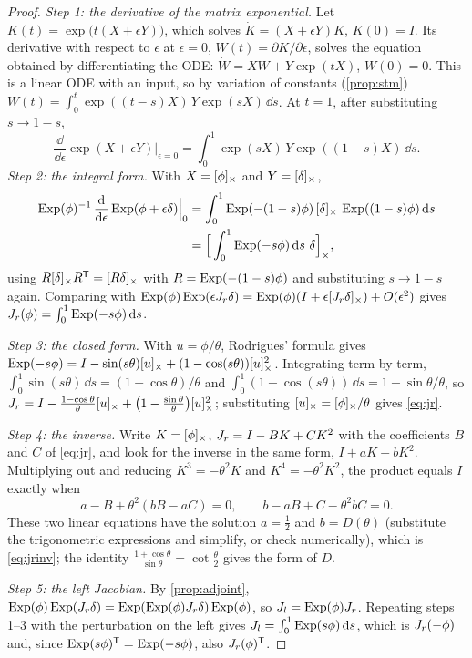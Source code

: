 \begin{proof}
\emph{Step 1: the derivative of the matrix exponential.} Let $K(t) = \exp\big(t(X + \epsilon Y)\big)$, which solves
$\dot K = (X + \epsilon Y)K$, $K(0) = I$. Its derivative with respect to $\epsilon$ at $\epsilon = 0$, $W(t) = \partial K/\partial\epsilon$, solves the equation obtained by
differentiating the ODE: $\dot W = XW + Y\exp(tX)$, $W(0) = 0$. This is a linear ODE with an input, so by variation of constants
(\cref{prop:stm}) $W(t) = \int_0^t\exp((t - s)X)\,Y\exp(sX)\,\dd s$. At $t = 1$, after substituting $s \to 1 - s$,
\begin{equation*}
  \frac{\dd}{\dd\epsilon}\exp(X + \epsilon Y)\Big|_{\epsilon=0} = \int_0^1 \exp(sX)\,Y\exp((1-s)X)\,\dd s .
\end{equation*}
\emph{Step 2: the integral form.} With $X = [\phi]_{\times}$ and $Y = [\delta]_{\times}$,
\begin{align*}
  \operatorname{Exp}(\phi)^{-1}\,\frac{\mathrm{d}}{\mathrm{d}\epsilon}\operatorname{Exp}(\phi + \epsilon\delta)\Big|_0
  &= \int_0^1 \operatorname{Exp}(-(1-s)\phi)\,[\delta]_{\times}\,\operatorname{Exp}((1-s)\phi)\,\mathrm{d} s \\
  &= \Big[\int_0^1 \operatorname{Exp}(-s\phi)\,\mathrm{d} s\ \delta\Big]_\times,
\end{align*}
using $R[\delta]_{\times}R^{\mathsf{T}} = [R\delta]_{\times}$ with $R = \operatorname{Exp}(-(1-s)\phi)$ and substituting $s \to 1 - s$ again. Comparing with
$\operatorname{Exp}(\phi)\operatorname{Exp}(\epsilon J_r\delta) = \operatorname{Exp}(\phi)(I + \epsilon[J_r\delta]_{\times}) + O(\epsilon^2)$ gives $J_r(\phi) = \int_0^1\operatorname{Exp}(-s\phi)\,\mathrm{d} s$.

\emph{Step 3: the closed form.} With $u = \phi/\theta$, Rodrigues' formula gives
$\operatorname{Exp}(-s\phi) = I - \sin(s\theta)[u]_{\times} + (1 - \cos(s\theta))[u]_{\times}^2$. Integrating term by term, $\int_0^1\sin(s\theta)\,\dd s = (1 - \cos\theta)/\theta$ and
$\int_0^1(1 - \cos(s\theta))\,\dd s = 1 - \sin\theta/\theta$, so
$J_r = I - \frac{1 - \cos\theta}{\theta}[u]_{\times} + \big(1 - \frac{\sin\theta}{\theta}\big)[u]_{\times}^2$; substituting $[u]_{\times} = [\phi]_{\times}/\theta$ gives \eqref{eq:jr}.

\emph{Step 4: the inverse.} Write $K = [\phi]_{\times}$, $J_r = I - BK + CK^2$ with the coefficients $B$ and $C$ of \eqref{eq:jr}, and look for the inverse in the
same form, $I + aK + bK^2$. Multiplying out and reducing $K^3 = -\theta^2K$ and $K^4 = -\theta^2K^2$, the product equals $I$ exactly when
\begin{equation*}
  a - B + \theta^2(bB - aC) = 0, \qquad b - aB + C - \theta^2bC = 0 .
\end{equation*}
These two linear equations have the solution $a = \tfrac12$ and $b = D(\theta)$ (substitute the trigonometric expressions and simplify, or
check numerically), which is \eqref{eq:jrinv}; the identity $\frac{1+\cos\theta}{\sin\theta} = \cot\frac\theta2$ gives the form of $D$.

\emph{Step 5: the left Jacobian.} By \cref{prop:adjoint}, $\operatorname{Exp}(\phi)\operatorname{Exp}(J_r\delta) = \operatorname{Exp}(\operatorname{Exp}(\phi)J_r\delta)\operatorname{Exp}(\phi)$, so $J_l = \operatorname{Exp}(\phi)J_r$. Repeating
steps 1--3 with the perturbation on the left gives $J_l = \int_0^1\operatorname{Exp}(s\phi)\,\mathrm{d} s$, which is $J_r(-\phi)$ and, since $\operatorname{Exp}(s\phi)^{\mathsf{T}} = \operatorname{Exp}(-s\phi)$,
also $J_r(\phi)^{\mathsf{T}}$.
\end{proof}

